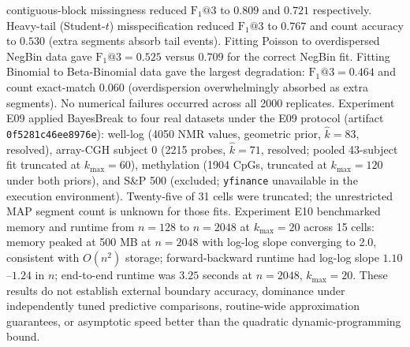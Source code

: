 contiguous-block missingness reduced $\mathrm{F}_1@3$ to $0.809$ and $0.721$ respectively. Heavy-tail (Student-$t$) misspecification reduced $\mathrm{F}_1@3$ to $0.767$ and count accuracy to $0.530$ (extra segments absorb tail events). Fitting Poisson to overdispersed NegBin data gave $\mathrm{F}_1@3=0.525$ versus $0.709$ for the correct NegBin fit. Fitting Binomial to Beta-Binomial data gave the largest degradation: $\mathrm{F}_1@3=0.464$ and count exact-match $0.060$ (overdispersion overwhelmingly absorbed as extra segments). No numerical failures occurred across all 2000 replicates. Experiment E09 applied BayesBreak to four real datasets under the E09 protocol (artifact \texttt{0f5281c46ee8976e}): well-log (4050 NMR values, geometric prior, $\hat{k}=83$, resolved), array-CGH subject 0 (2215 probes, $\hat{k}=71$, resolved; pooled 43-subject fit truncated at $k_{\max}=60$), methylation (1904 CpGs, truncated at $k_{\max}=120$ under both priors), and S\&P 500 (excluded; \texttt{yfinance} unavailable in the execution environment). Twenty-five of 31 cells were truncated; the unrestricted MAP segment count is unknown for those fits. Experiment E10 benchmarked memory and runtime from $n=128$ to $n=2048$ at $k_{\max}=20$ across 15 cells: memory peaked at 500 MB at $n=2048$ with log-log slope converging to 2.0, consistent with $O(n^2)$ storage; forward-backward runtime had log-log slope $1.10$--$1.24$ in $n$; end-to-end runtime was $3.25$ seconds at $n=2048$, $k_{\max}=20$. These results do not establish external boundary accuracy, dominance under independently tuned predictive comparisons, routine-wide approximation guarantees, or asymptotic speed better than the quadratic dynamic-programming bound.
